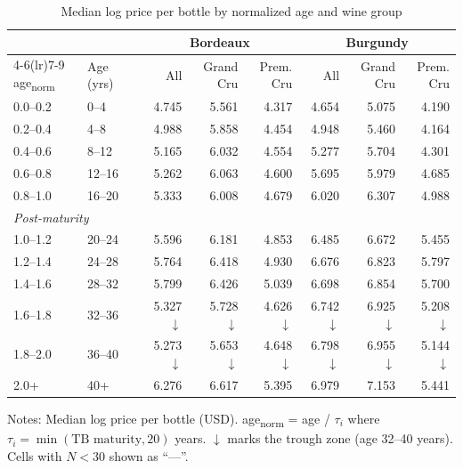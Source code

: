 \begin{table}[htbp]
\centering
\caption{Median log price per bottle by normalized age and wine group}
\label{tab:price_age_medians}
\footnotesize
\begin{threeparttable}
\begin{tabular}{llcrrrrrr}
\toprule
 &  & & \multicolumn{3}{c}{Bordeaux} & \multicolumn{3}{c}{Burgundy} \\
\cmidrule(lr){4-6}\cmidrule(lr){7-9}
age\textsubscript{norm} & Age (yrs) & & All & Grand Cru & Prem. Cru & All & Grand Cru & Prem. Cru \\
\midrule
0.0--0.2 & 0--4 & & 4.745 & 5.561 & 4.317 & 4.654 & 5.075 & 4.190 \\
0.2--0.4 & 4--8 & & 4.988 & 5.858 & 4.454 & 4.948 & 5.460 & 4.164 \\
0.4--0.6 & 8--12 & & 5.165 & 6.032 & 4.554 & 5.277 & 5.704 & 4.301 \\
0.6--0.8 & 12--16 & & 5.262 & 6.063 & 4.600 & 5.695 & 5.979 & 4.685 \\
0.8--1.0 & 16--20 & & 5.333 & 6.008 & 4.679 & 6.020 & 6.307 & 4.988 \\
\midrule
\multicolumn{9}{l}{\textit{Post-maturity}} \\
1.0--1.2 & 20--24 & & 5.596 & 6.181 & 4.853 & 6.485 & 6.672 & 5.455 \\
1.2--1.4 & 24--28 & & 5.764 & 6.418 & 4.930 & 6.676 & 6.823 & 5.797 \\
1.4--1.6 & 28--32 & & 5.799 & 6.426 & 5.039 & 6.698 & 6.854 & 5.700 \\
1.6--1.8 & 32--36 & & 5.327 $\downarrow$ & 5.728 $\downarrow$ & 4.626 $\downarrow$ & 6.742 $\downarrow$ & 6.925 $\downarrow$ & 5.208 $\downarrow$ \\
1.8--2.0 & 36--40 & & 5.273 $\downarrow$ & 5.653 $\downarrow$ & 4.648 $\downarrow$ & 6.798 $\downarrow$ & 6.955 $\downarrow$ & 5.144 $\downarrow$ \\
2.0+ & 40+ & & 6.276 & 6.617 & 5.395 & 6.979 & 7.153 & 5.441 \\
\bottomrule
\end{tabular}
\begin{tablenotes}
\footnotesize
\item Notes: Median log price per bottle (USD). age\textsubscript{norm} = age / $\tau_i$
  where $\tau_i = \min(\text{TB maturity}, 20)$ years.
  $\downarrow$ marks the trough zone (age 32--40 years).
  Cells with $N < 30$ shown as ``---''.
\end{tablenotes}
\end{threeparttable}
\end{table}
